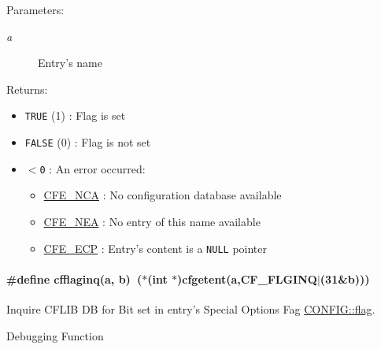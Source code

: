 \begin{Desc}
\item[Parameters:]
\begin{description}
\item[{\em a}]Entry's name\end{description}
\end{Desc}
\begin{Desc}
\item[Returns:]\begin{itemize}
\item {\tt TRUE} (1) : Flag is set\item {\tt FALSE} (0) : Flag is not set\item {\tt $<$0} : An error occurred: \begin{itemize}
\item \hyperlink{group__errors_gf8cd36471ddcc549668f49238855609d}{CFE\_\-NCA} : No configuration database available \item \hyperlink{group__errors_g7f7e54a5ccefa34556fe6da3b35b4f27}{CFE\_\-NEA} : No entry of this name available \item \hyperlink{group__errors_gaa38e8556d85b1bb41037b3bd022bc28}{CFE\_\-ECP} : Entry's content is a {\tt NULL} pointer \end{itemize}
\end{itemize}
\end{Desc}
\hypertarget{group__retrieval_g09929d4a48932749dd9d0d32d0f3f08c}{
\paragraph[{cfflaginq}]{\setlength{\rightskip}{0pt plus 5cm}\#define cfflaginq(a, \/  b)~($\ast$(int $\ast$)cfgetent(a,CF\_\-FLGINQ$|$(31\&b)))}\hfill}
\label{group__retrieval_g09929d4a48932749dd9d0d32d0f3f08c}


Inquire CFLIB DB for Bit set in entry's Special Options Fag \hyperlink{struct_c_o_n_f_i_g_b04d08abdf758c0400caaded716f4089}{CONFIG::flag}. 

Debugging Function

